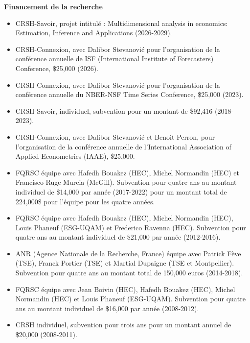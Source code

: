 \vspace{.3cm}



\centerline{\bf Financement de la recherche}

\begin{itemize}

\item CRSH-Savoir, projet intitul\'e : Multidimensional analysis in economics: Estimation, Inference and Applications (2026-2029).

\item CRSH-Connexion, avec Dalibor Stevanovi\'c pour l'organisation de la conf\'erence annuelle de ISF (International Institute of Forecasters) Conference, \$25,000 (2026).


\item CRSH-Connexion, avec Dalibor Stevanovi\'c pour l'organisation de la conf\'erence annuelle du NBER-NSF Time Series Conference, \$25,000 (2023).

\item CRSH-Savoir, individuel, subvention pour un montant
de \$92,416 (2018-2023).

\item CRSH-Connexion, avec Dalibor Stevanovi\'c et Benoit Perron, pour l'organisation de la conf\'erence annuelle de l'International Association of Applied Econometrics (IAAE), \$25,000.

\item FQRSC \'equipe avec Hafedh Bouakez (HEC), Michel Normandin (HEC) et Francisco Ruge-Murcia (McGill). Subvention pour quatre ans au montant
individuel de \$14,000 par ann\'ee (2017-2022) pour un montant total de 224,000\$ pour l'\'equipe pour les quatre ann\'ees.

\item FQRSC \'equipe avec Hafedh Bouakez (HEC), Michel Normandin (HEC), Louis Phaneuf (ESG-UQAM) et Frederico Ravenna (HEC). Subvention pour quatre ans au montant
individuel de \$21,000 par ann\'ee (2012-2016).

\item ANR (Agence Nationale de la Recherche, France) \'equipe avec Patrick F\`eve (TSE), Franck Portier (TSE) et Martial Dupaigne (TSE et Montpellier). Subvention pour quatre ans au montant
total de 150,000 euros  (2014-2018).


\item FQRSC \'equipe avec Jean Boivin (HEC), Hafedh Bouakez (HEC), Michel Normandin (HEC) et Louis Phaneuf (ESG-UQAM). Subvention pour quatre ans au montant
individuel de \$16,000 par ann\'ee (2008-2012).

\item CRSH individuel, subvention pour trois ans pour un montant
annuel de \$20,000 (2008-2011).

\end{itemize}


